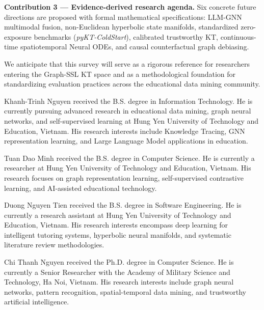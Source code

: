 ﻿\documentclass[10pt,journal,compsoc]{IEEEtran}
\begin{document}
\textbf{Contribution 3 --- Evidence-derived research agenda.} Six concrete future directions are proposed with formal mathematical specifications: LLM-GNN multimodal fusion, non-Euclidean hyperbolic state manifolds, standardized zero-exposure benchmarks (\textit{pyKT-ColdStart}), calibrated trustworthy KT, continuous-time spatiotemporal Neural ODEs, and causal counterfactual graph debiasing.

We anticipate that this survey will serve as a rigorous reference for researchers entering the Graph-SSL KT space and as a methodological foundation for standardizing evaluation practices across the educational data mining community.




\begin{IEEEbiographynophoto}{Khanh-Trinh Nguyen}
received the B.S. degree in Information Technology. He is currently pursuing advanced research in educational data mining, graph neural networks, and self-supervised learning at Hung Yen University of Technology and Education, Vietnam. His research interests include Knowledge Tracing, GNN representation learning, and Large Language Model applications in education.
\end{IEEEbiographynophoto}

\begin{IEEEbiographynophoto}{Tuan Dao Minh}
received the B.S. degree in Computer Science. He is currently a researcher at Hung Yen University of Technology and Education, Vietnam. His research focuses on graph representation learning, self-supervised contrastive learning, and AI-assisted educational technology.
\end{IEEEbiographynophoto}

\begin{IEEEbiographynophoto}{Duong Nguyen Tien}
received the B.S. degree in Software Engineering. He is currently a research assistant at Hung Yen University of Technology and Education, Vietnam. His research interests encompass deep learning for intelligent tutoring systems, hyperbolic neural manifolds, and systematic literature review methodologies.
\end{IEEEbiographynophoto}

\begin{IEEEbiographynophoto}{Chi Thanh Nguyen}
received the Ph.D. degree in Computer Science. He is currently a Senior Researcher with the Academy of Military Science and Technology, Ha Noi, Vietnam. His research interests include graph neural networks, pattern recognition, spatial-temporal data mining, and trustworthy artificial intelligence.
\end{IEEEbiographynophoto}
\end{document}
